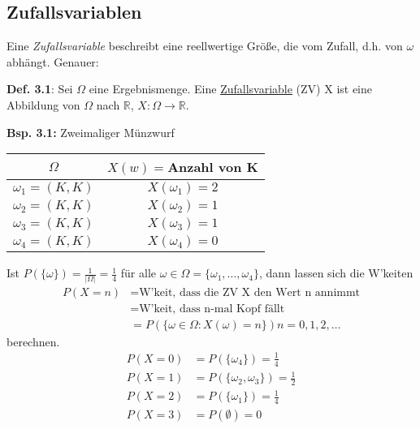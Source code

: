 \documentclass[a4paper,11pt]{article}
\begin{document}
\subsection{Zufallsvariablen}
\noindent Eine \textit{Zufallsvariable} beschreibt eine reellwertige Größe, die vom Zufall, d.h. von $\omega$ abhängt. Genauer:

\vspace{6pt}
\noindent\textbf{Def. 3.1}: Sei $\Omega$ eine Ergebnismenge. Eine \underline{Zufallsvariable} (ZV) X ist eine Abbildung von $\Omega$ nach $\mathbb{R}$, $X:\Omega \rightarrow \mathbb{R}$.

\vspace{6pt}
\noindent\textbf{Bsp. 3.1:}\label{bsp3.1} Zweimaliger Münzwurf
\begin{center}
\begin{tabular}{c|c}
    $\Omega$ & $X(w)=$Anzahl von K\\
    \hline
    $\omega_1=(K,K)$ & $X(\omega_1)=2$\\
    $\omega_2=(K,K)$ & $X(\omega_2)=1$\\
    $\omega_3=(K,K)$ & $X(\omega_3)=1$\\
    $\omega_4=(K,K)$ & $X(\omega_4)=0$\\
\end{tabular}
\end{center}
Ist $P(\{\omega\})=\frac{1}{|\Omega|}=\frac{1}{4}$ für alle $\omega\in\Omega=\{\omega_1,\dots,\omega_4\}$, dann lassen sich die W'keiten 
\begin{align*}
    P(X=n) &= \text{W'keit, dass die ZV X den Wert n annimmt}\\
    &= \text{W'keit, dass n-mal Kopf fällt}\\
    &= P(\{\omega\in\Omega:X(\omega)=n\}) n=0,1,2,\dots
\end{align*}
berechnen.
\begin{align*}
P(X=0) &= P(\{\omega_4\})=\frac{1}{4}\\
P(X=1) &= P(\{\omega_2,\omega_3\})=\frac{1}{2}\\
P(X=2) &= P(\{\omega_1\})=\frac{1}{4}\\
P(X=3) &= P(\emptyset)=0
\end{align*}
\end{document}
